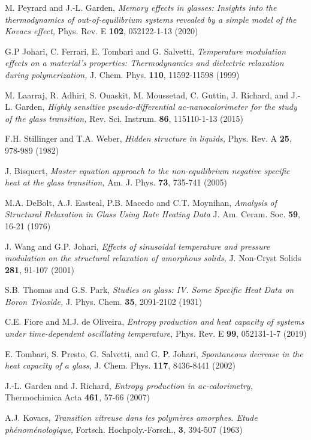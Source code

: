 \documentclass[pre,a4paper,twocolumn,superscriptaddress,%
floatfix]{revtex4}
\begin{document}
\begin{thebibliography}{xx}
M. Peyrard and J.-L. Garden,
{\it Memory effects in glasses: Insights into the thermodynamics of
  out-of-equilibrium systems revealed by a simple model of the Kovacs effect,}
Phys. Rev. E {\bf 102}, 052122-1-13 (2020)

G.P Johari, C. Ferrari, E. Tombari and G. Salvetti,
{\it Temperature modulation effects on a material’s properties:
  Thermodynamics and dielectric relaxation during polymerization,}
J. Chem. Phys. {\bf 110}, 11592-11598 (1999)

M. Laarraj, R. Adhiri, S. Ouaskit, M. Moussetad,
C. Guttin, J. Richard, and J.-L. Garden,
{\it Highly sensitive pseudo-differential ac-nanocalorimeter for the study
  of the glass transition,}
Rev. Sci. Instrum. {\bf 86}, 115110-1-13 (2015)

F.H. Stillinger and T.A. Weber,
{\it Hidden structure in liquids,}
Phys. Rev. A {\bf 25}, 978-989 (1982)

J. Bisquert,
{\it Master equation approach to the non-equilibrium negative specific heat
at the glass transition,}
Am. J. Phys. {\bf 73}, 735-741 (2005)

M.A. DeBolt, A.J. Easteal, P.B. Macedo and C.T. Moynihan,
{\em Amalysis of Structural Relaxation in Glass Using Rate Heating Data}
J. Am. Ceram. Soc. {\bf 59}, 16-21 (1976)

J. Wang and G.P. Johari,
{\it Effects of sinusoidal temperature and pressure modulation on
the structural relaxation of amorphous solids,}
J. Non-Cryst Solids {\bf 281}, 91-107 (2001)

S.B. Thomas and G.S. Park,
{\it Studies on glass: IV. Some Specific Heat Data on Boron Trioxide,}
J. Phys. Chem. {\bf 35}, 2091-2102 (1931)

C.E. Fiore and M.J. de Oliveira,
{\it Entropy production and heat capacity of systems under time-dependent
  oscillating temperature,}
Phys. Rev. E {\bf 99}, 052131-1-7 (2019)

E. Tombari, S. Presto, G. Salvetti, and G. P. Johari,
{\it Spontaneous decrease in the heat capacity of a glass,}
J. Chem. Phys. {\bf 117}, 8436-8441 (2002)

J.-L. Garden and J. Richard,
{\it Entropy production in ac-calorimetry,}
Thermochimica Acta {\bf 461}, 57-66 (2007)

A.J. Kovacs,
{\it Transition vitreuse dans les polymères amorphes. Etude
  phénoménologique,}
Fortsch. Hochpoly.-Forsch., {\bf 3}, 394-507 (1963)


\end{thebibliography}
\end{document}
